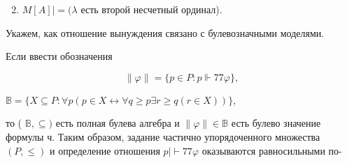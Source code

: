 \documentclass[10pt]{article}
\begin{document}
\begin{enumerate}

  \setcounter{enumi}{1}

  \item $M[A] \mid=(\lambda$ есть второй несчетный ординал).

\end{enumerate}



Укажем, как отношение вынуждения связано с булевозначными моделями.



Если ввести обозначения



\[

\|\varphi\|=\{p \in P: p \Vdash 77 \varphi\},

\]



$\mathbb{B}=\{X \subseteq P: \forall p(p \in X \longleftrightarrow \forall q \geqslant p \exists r \geqslant q(r \in X))\}$,



то ( $\mathbb{B}, \subseteq)$ есть полная булева алгебра и $\|\varphi\| \in \mathbb{B}$ есть булево значение формулы $ч$. Таким образом, задание частично упорядоченного множества $(P, \leqslant)$ и определение отношения $p \mid \vdash 77 \varphi$ оказываются равносильными по-
\end{document}
